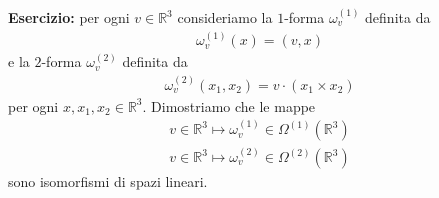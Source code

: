\documentclass[oneside, 11pt]{amsbook}
\newcommand{\0}{{(0)}}
\newcommand{\3}{{(3)}}
\theoremstyle{colonplain}
\theoremstyle{colondefinition}
\theoremstyle{colonremark}
\numberwithin{equation}{chapter}
\begin{document}
\textbf{Esercizio:} per ogni $v \in \mathbb{R}^3$ consideriamo la $1$-forma $\omega^{(1)}_v$ definita da
\begin{align}
    \omega^{(1)}_v(x) = (v, x)
\end{align}
e la $2$-forma $\omega^{(2)}_v$ definita da
\begin{align}
    \omega^{(2)}_v(x_1, x_2) = v \cdot (x_1 \times x_2)
\end{align}
per ogni $x, x_1, x_2 \in \mathbb{R}^3$. Dimostriamo che le mappe 
\begin{align}\label{ScalProd}
    v \in \mathbb{R}^3 \mapsto \omega^{(1)}_v \in \Omega^{(1)}(\mathbb{R}^3) \\
    \label{MixProd}
    v \in \mathbb{R}^3 \mapsto \omega^{(2)}_v \in \Omega^{(2)}(\mathbb{R}^3)
\end{align}
sono isomorfismi di spazi lineari.
\end{document}
